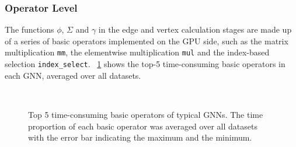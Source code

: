 \subsubsection{Operator Level}

The functions $\phi$, $\Sigma$ and $\gamma$ in the edge and vertex calculation stages are made up of a series of basic operators implemented on the GPU side, such as the matrix multiplication \texttt{mm}, the elementwise multiplication \texttt{mul} and the index-based selection \texttt{index\_select}.
%
\figurename~\ref{fig:exp_top_basic_ops} shows the top-5 time-consuming basic operators in each GNN, averaged over all datasets.

\begin{figure}[H]
    \centering
    \\
    \caption{Top 5 time-consuming basic operators of typical GNNs. The time proportion of each basic operator was averaged over all datasets with the error bar indicating the maximum and the minimum.}
    \label{fig:exp_top_basic_ops}
\end{figure}

